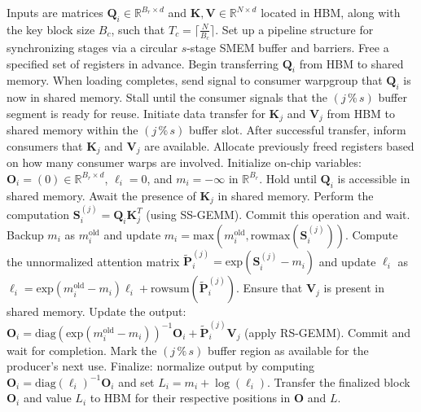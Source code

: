 \begin{algorithm}[H]
    \caption{\small\label{alg:flash3_wgmma_ws_only}\textsc{FlashAttention-3} forward pass \textbf{excluding} intra-consumer overlap -- CTA view}
    \begin{algorithmic}[1]
\REQUIRE Inputs are matrices $\mathbf{Q}_i \in \mathbb{R}^{B_r \times d}$ and $\mathbf{K}, \mathbf{V} \in \mathbb{R}^{N \times d}$ located in HBM, along with the key block size $B_c$, such that $T_c = \lceil \frac{N}{B_c} \rceil$.
\STATE Set up a pipeline structure for synchronizing stages via a circular $s$-stage SMEM buffer and barriers.
\STATE Free a specified set of registers in advance.
\STATE Begin transferring $\mathbf{Q}_i$ from HBM to shared memory.
\STATE When loading completes, send signal to consumer warpgroup that $\mathbf{Q}_i$ is now in shared memory.
    \STATE Stall until the consumer signals that the $(j\,\%\,s)$ buffer segment is ready for reuse.
    \STATE Initiate data transfer for $\mathbf{K}_j$ and $\mathbf{V}_j$ from HBM to shared memory within the $(j\,\%\,s)$ buffer slot.
    \STATE After successful transfer, inform consumers that $\mathbf{K}_j$ and $\mathbf{V}_j$ are available.
\ENDFOR
\ELSE 
\STATE Allocate previously freed registers based on how many consumer warps are involved.
\STATE Initialize on-chip variables: $\mathbf{O}_i = (0) \in \mathbb{R}^{B_r \times d}$, $\ell_i = 0$, and $m_i = -\infty$ in $\mathbb{R}^{B_r}$.
\STATE Hold until $\mathbf{Q}_i$ is accessible in shared memory.
\STATE Await the presence of $\mathbf{K}_j$ in shared memory.
\STATE Perform the computation $\mathbf{S}_i^{(j)} = \mathbf{Q}_i \mathbf{K}_j^T$ (using SS-GEMM). Commit this operation and wait. \label{alg:ws_only_gemm1}
\STATE Backup $m_i$ as $m_i^{\mathrm{old}}$ and update $m_i = \mathrm{max}(m_i^{\mathrm{old}}, \mathrm{rowmax}(\mathbf{S}_i^{(j)}))$. \label{code-ws:softmax_start}
\STATE Compute the unnormalized attention matrix $\widetilde{\mathbf{P}}_i^{(j)} = \mathrm{exp}(\mathbf{S}_i^{(j)} - m_i)$ and update $\ell_i$ as $\ell_i = \mathrm{exp}(m_i^{\mathrm{old}} - m_i) \ell_i + \mathrm{rowsum}(\widetilde{\mathbf{P}}_i^{(j)})$. \label{code-ws:softmax_end}
\STATE Ensure that $\mathbf{V}_j$ is present in shared memory.
\STATE Update the output: $\mathbf{O}_i = \mathrm{diag}(\mathrm{exp}(m_i^{\mathrm{old}} - m_i))^{-1} \mathbf{O}_i + \widetilde{\mathbf{P}}_i^{(j)} \mathbf{V}_j$ (apply RS-GEMM). Commit and wait for completion. \label{alg:ws_only_gemm2}
\STATE Mark the $(j\,\%\,s)$ buffer region as available for the producer’s next use.
\ENDFOR
\STATE Finalize: normalize output by computing $\mathbf{O}_i = \mathrm{diag}(\ell_i)^{-1} \mathbf{O}_i$ and set $L_i = m_i + \log(\ell_i)$.
\STATE Transfer the finalized block $\mathbf{O}_i$ and value $L_i$ to HBM for their respective positions in $\mathbf{O}$ and $L$.
\ENDIF
\end{algorithmic}
\end{algorithm}

